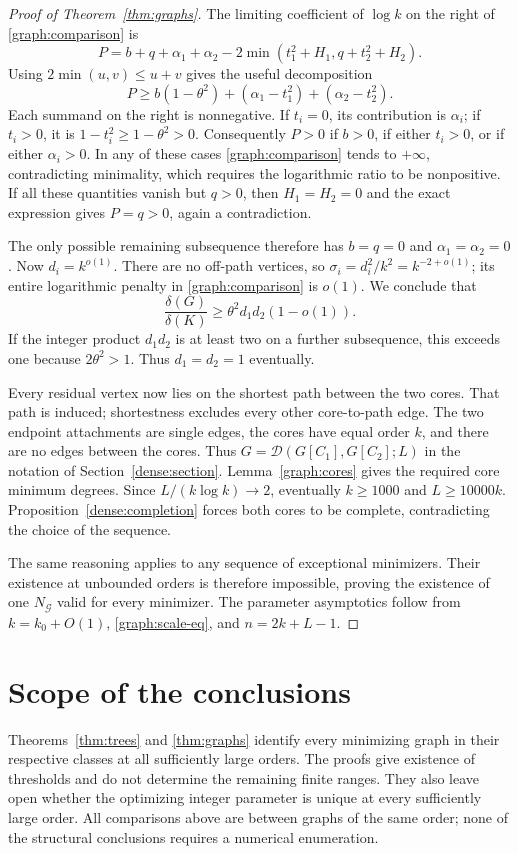 \documentclass[11pt,a4paper]{article}
\numberwithin{equation}{section}
\theoremstyle{definition}
\theoremstyle{remark}
\begin{document}
\begin{proof}[Proof of Theorem~\ref{thm:graphs}]
The limiting coefficient of $\log k$ on the right of
\eqref{graph:comparison} is
\[
 P=b+q+\alpha_1+\alpha_2
 -2\min(t_1^2+H_1,q+t_2^2+H_2).
\]
Using $2\min(u,v)\le u+v$ gives the useful decomposition
\begin{equation}\label{graph:coefficient}
 P\ge b(1-\theta^2)+
 (\alpha_1-t_1^2)+(\alpha_2-t_2^2).
\end{equation}
Each summand on the right is nonnegative. If $t_i=0$, its contribution
is $\alpha_i$; if $t_i>0$, it is $1-t_i^2\ge1-\theta^2>0$.
Consequently $P>0$ if $b>0$, if either $t_i>0$, or if either
$\alpha_i>0$. In any of these cases \eqref{graph:comparison} tends
to $+\infty$, contradicting minimality, which requires the logarithmic
ratio to be nonpositive. If all these quantities vanish but $q>0$,
then $H_1=H_2=0$ and the exact expression gives $P=q>0$, again a
contradiction.

The only possible remaining subsequence therefore has $b=q=0$ and
$\alpha_1=\alpha_2=0$. Now $d_i=k^{o(1)}$. There are no off-path
vertices, so
$\sigma_i=d_i^2/k^2=k^{-2+o(1)}$; its entire logarithmic penalty in
\eqref{graph:comparison} is $o(1)$. We conclude that
\[
 \frac{\delta(G)}{\delta(K)}
 \ge\theta^2d_1d_2(1-o(1)).
\]
If the integer product $d_1d_2$ is at least two on a further
subsequence, this exceeds one because $2\theta^2>1$. Thus
$d_1=d_2=1$ eventually.

Every residual vertex now lies on the shortest path between the two
cores. That path is induced; shortestness excludes every other
core-to-path edge. The two endpoint attachments are single edges, the
cores have equal order $k$, and there are no edges between the cores.
Thus $G=\mathcal D(G[C_1],G[C_2];L)$ in the notation of
Section~\ref{dense:section}. Lemma~\ref{graph:cores} gives the
required core minimum degrees. Since $L/(k\log k)\to2$, eventually
$k\ge1000$ and $L\ge10000k$. Proposition~\ref{dense:completion}
forces both cores to be complete, contradicting the choice of the
sequence.

The same reasoning applies to any sequence of exceptional minimizers.
Their existence at unbounded orders is therefore impossible, proving
the existence of one $N_{\mathcal G}$ valid for every minimizer.
The parameter asymptotics follow from $k=k_0+O(1)$,
\eqref{graph:scale-eq}, and $n=2k+L-1$.
\end{proof}

\section{Scope of the conclusions}
Theorems~\ref{thm:trees} and \ref{thm:graphs} identify every minimizing
graph in their respective classes at all sufficiently large orders.
The proofs give existence of thresholds and do not determine the
remaining finite ranges. They also leave open whether the optimizing
integer parameter is unique at every sufficiently large order.
All comparisons above are between graphs of the same order; none of
the structural conclusions requires a numerical enumeration.



\end{document}
